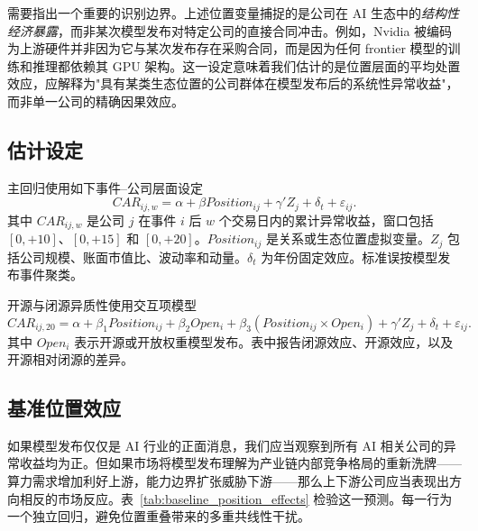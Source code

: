 \documentclass[11pt,fontset=fandol,a4paper]{ctexart}
\begin{document}
需要指出一个重要的识别边界。上述位置变量捕捉的是公司在 AI 生态中的\emph{结构性经济暴露}，而非某次模型发布对特定公司的直接合同冲击。例如，Nvidia 被编码为上游硬件并非因为它与某次发布存在采购合同，而是因为任何 frontier 模型的训练和推理都依赖其 GPU 架构。这一设定意味着我们估计的是位置层面的平均处置效应，应解释为"具有某类生态位置的公司群体在模型发布后的系统性异常收益"，而非单一公司的精确因果效应。

\subsection{估计设定}

主回归使用如下事件--公司层面设定
\[
CAR_{ij,w}=\alpha+\beta Position_{ij}+\gamma'Z_j+\delta_t+\varepsilon_{ij}.
\]
其中 $CAR_{ij,w}$ 是公司 $j$ 在事件 $i$ 后 $w$ 个交易日内的累计异常收益，窗口包括 $[0,+10]$、$[0,+15]$ 和 $[0,+20]$。$Position_{ij}$ 是关系或生态位置虚拟变量。$Z_j$ 包括公司规模、账面市值比、波动率和动量。$\delta_t$ 为年份固定效应。标准误按模型发布事件聚类。

开源与闭源异质性使用交互项模型
\[
CAR_{ij,20}=\alpha+\beta_1 Position_{ij}+\beta_2 Open_i+\beta_3(Position_{ij}\times Open_i)+\gamma'Z_j+\delta_t+\varepsilon_{ij}.
\]
其中 $Open_i$ 表示开源或开放权重模型发布。表中报告闭源效应、开源效应，以及开源相对闭源的差异。

\subsection{基准位置效应}\label{sec:baseline}

如果模型发布仅仅是 AI 行业的正面消息，我们应当观察到所有 AI 相关公司的异常收益均为正。但如果市场将模型发布理解为产业链内部竞争格局的重新洗牌——算力需求增加利好上游，能力边界扩张威胁下游——那么上下游公司应当表现出方向相反的市场反应。表~\ref{tab:baseline_position_effects} 检验这一预测。每一行为一个独立回归，避免位置重叠带来的多重共线性干扰。
\end{document}
